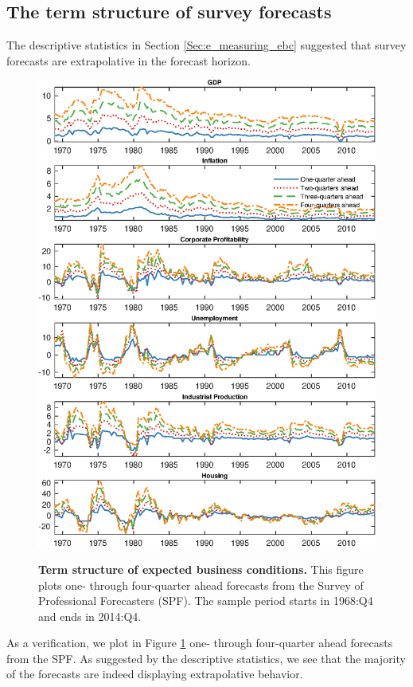 \documentclass[12pt,letterpaper,leqno,doublespacing]{article}
\begin{document}
\begin{appendices}

\section{The term structure of survey forecasts}\label{sec:e_the_term_structure_of_expected_business_conditions}
The descriptive statistics in Section \ref{Sec:e_measuring_ebc} suggested that survey forecasts are extrapolative in the forecast horizon.  
\begin{figure}[tbp]
    \caption{
        \textbf{Term structure of expected business conditions.} \newline
        This figure plots one- through four-quarter ahead forecasts from the Survey of Professional Forecasters (SPF). The sample period starts in 1968:Q4 and ends in 2014:Q4.
    }
    \centering
    \includegraphics[scale=0.8]{figures/e_survey_expectations.eps}
    \label{Fig:e_survey_expectations}
\end{figure}
As a verification, we plot in Figure \ref{Fig:e_survey_expectations} one- through four-quarter ahead forecasts from the SPF. As suggested by the descriptive statistics, we see that the majority of the forecasts are indeed displaying extrapolative behavior.


\end{appendices}
\end{document}

